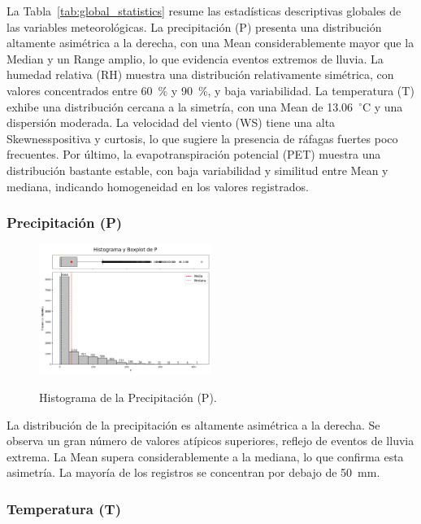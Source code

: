 La Tabla~\ref{tab:global_statistics} resume las estadísticas descriptivas globales de las variables meteorológicas. La precipitación (P) presenta una distribución altamente asimétrica a la derecha, con una Mean considerablemente mayor que la Median y un Range amplio, lo que evidencia eventos extremos de lluvia. La humedad relativa (RH) muestra una distribución relativamente simétrica, con valores concentrados entre 60~\% y 90~\%, y baja variabilidad. La temperatura (T) exhibe una distribución cercana a la simetría, con una Mean de 13.06~$^\circ$C y una dispersión moderada. La velocidad del viento (WS) tiene una alta Skewnesspositiva y curtosis, lo que sugiere la presencia de ráfagas fuertes poco frecuentes. Por último, la evapotranspiración potencial (PET) muestra una distribución bastante estable, con baja variabilidad y similitud entre Mean y mediana, indicando homogeneidad en los valores registrados.

\subsubsection*{Precipitación (P)}

\begin{figure}[H]
    \caption{Histograma de la Precipitación (P).}
    \centering
    \includegraphics[width=0.5\textwidth]{resultados/global/univariado/P_histograma.png}
    \label{fig:P_histograma}
\end{figure}

La distribución de la precipitación es altamente asimétrica a la derecha. Se observa un gran número de valores atípicos superiores, reflejo de eventos de lluvia extrema. La Mean supera considerablemente a la mediana, lo que confirma esta asimetría. La mayoría de los registros se concentran por debajo de \SI{50}{\milli\meter}.

\vspace{2em}

\subsubsection*{Temperatura (T)}

